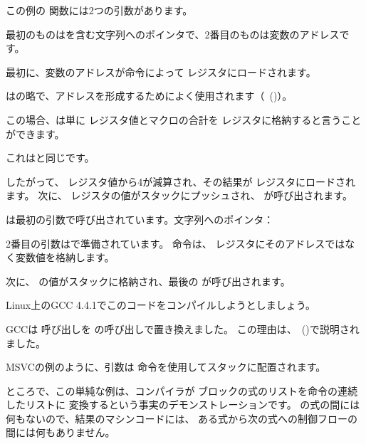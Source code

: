 この例の \scanf 関数には2つの引数があります。

最初のものはを含む文字列へのポインタで、2番目のものは変数のアドレスです。

最初に、変数のアドレスが命令によって \EAX レジスタにロードされます。

\LEA はの略で、アドレスを形成するためによく使用されます（~()）。

この場合、\LEA は単に \EBP レジスタ値とマクロの合計を \EAX レジスタに格納すると言うことができます。

これはと同じです。

したがって、 \EBP レジスタ値から4が減算され、その結果が \EAX レジスタにロードされます。
次に、 \EAX レジスタの値がスタックにプッシュされ、 \scanf が呼び出されます。

\printf は最初の引数で呼び出されています。文字列へのポインタ：

2番目の引数はで準備されています。
命令は、 \ECX レジスタにそのアドレスではなく変数値を格納します。

次に、 \ECX の値がスタックに格納され、最後の \printf が呼び出されます。




Linux上のGCC 4.4.1でこのコードをコンパイルしようとしましょう。



GCCは \printf 呼び出しを \puts の呼び出しで置き換えました。 この理由は、~()で説明されました。

% 

MSVCの例のように、引数は \MOV 命令を使用してスタックに配置されます。


ところで、この単純な例は、コンパイラが \CCpp ブロックの式のリストを命令の連続したリストに
変換するという事実のデモンストレーションです。
\CCpp の式の間には何もないので、結果のマシンコードには、
ある式から次の式への制御フローの間には何もありません。
